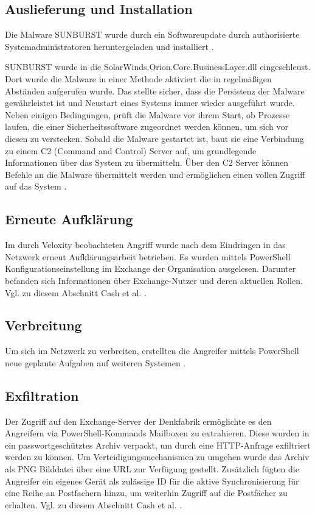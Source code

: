\documentclass[conference]{IEEEtran}
\begin{document}
\subsection{Auslieferung und Installation}
Die Malware SUNBURST wurde durch ein Softwareupdate durch authorisierte Systemadministratoren heruntergeladen und installiert \cite{FIREEYE2020}.

SUNBURST wurde in die SolarWinds.Orion.Core.BusinessLayer.dll eingeschleust.
Dort wurde die Malware in einer Methode aktiviert die in regelmäßigen Abständen aufgerufen wurde.
Das stellte sicher, dass die Persistenz der Malware gewährleistet ist und Neustart eines Systems immer wieder ausgeführt wurde.
Neben einigen Bedingungen, prüft die Malware vor ihrem Start, ob Prozesse laufen, die einer Sicherheitssoftware zugeordnet werden können, um sich vor diesen zu verstecken.
Sobald die Malware gestartet ist, baut sie eine Verbindung zu einem C2 (Command and Control) Server auf, um grundlegende Informationen über das System zu übermitteln.
Über den C2 Server können Befehle an die Malware übermittelt werden und ermöglichen einen vollen Zugriff auf das System \cite{Intelligence2020}.

\subsection{Erneute Aufklärung}
Im durch Veloxity beobachteten Angriff wurde nach dem Eindringen in das Netzwerk erneut Aufklärungsarbeit betrieben.
Es wurden mittels PowerShell Konfigurationseinstellung im Exchange der Organisation ausgelesen.
Darunter befanden sich Informationen über Exchange-Nutzer und deren aktuellen Rollen.
Vgl. zu diesem Abschnitt Cash et al. \cite{Cash2020}.

\subsection{Verbreitung}
Um sich im Netzwerk zu verbreiten, erstellten die Angreifer mittels PowerShell neue geplante Aufgaben auf weiteren Systemen \cite{Cash2020}.

\subsection{Exfiltration}
Der Zugriff auf den Exchange-Server der Denkfabrik ermöglichte es den Angreifern via PowerShell-Kommands Mailboxen zu extrahieren.
Diese wurden in ein passwortgeschütztes Archiv verpackt, um durch eine HTTP-Anfrage exfiltriert werden zu können.
Um Verteidigungsmechanismen zu umgehen wurde das Archiv als PNG Bilddatei über eine URL zur Verfügung gestellt.
Zusätzlich fügten die Angreifer ein eigenes Gerät als zulässige ID für die aktive Synchronisierung für eine Reihe an Postfachern hinzu, um weiterhin Zugriff auf die Postfächer zu erhalten.
Vgl. zu diesem Abschnitt Cash et al. \cite{Cash2020}.
\end{document}
